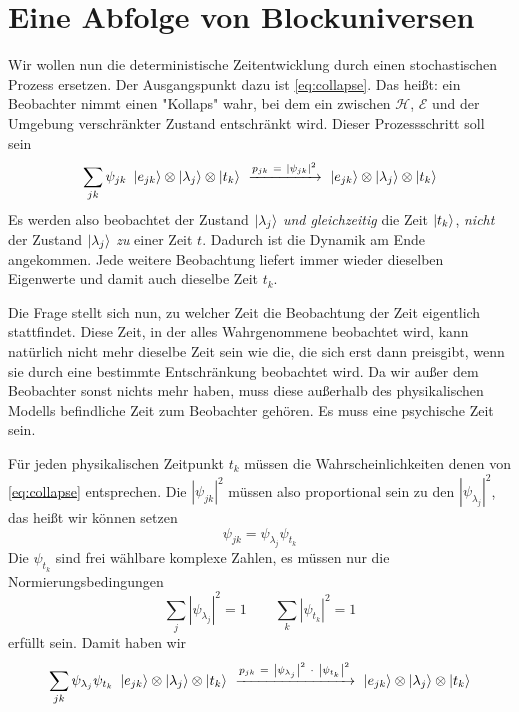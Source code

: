 \documentclass[12pt]{article}
\begin{document}
\section{Eine Abfolge von Blockuniversen}

Wir wollen nun die deterministische Zeitentwicklung durch einen stochastischen Prozess ersetzen. Der Ausgangspunkt dazu ist \eqref{eq:collapse}. Das heißt: ein Beobachter nimmt einen "Kollaps" wahr, bei dem ein zwischen $\mathscr{H}$, $\mathscr{E}$ und der Umgebung verschränkter Zustand entschränkt wird. Dieser Prozessschritt soll sein
\begin{equation*} 
\sum_{jk} \psi_{jk}\ \ket{e_{jk}} \otimes \ket{\lambda_j} \otimes \ket{t_k} 
\ \xrightarrow{p_{jk}\ =\ \left|\psi_{jk}\right|^2}\ 
\ket{e_{jk}} \otimes \ket{\lambda_j} \otimes \ket{t_k}
\end{equation*}
Es werden also beobachtet der Zustand $\ket{\lambda_j}$ \emph{und gleichzeitig} die Zeit $\ket{t_k}$, \emph{nicht} der Zustand $\ket{\lambda_j}$ \emph{zu} einer Zeit $t$. Dadurch ist die Dynamik am Ende angekommen. Jede weitere Beobachtung liefert immer wieder dieselben Eigenwerte und damit auch dieselbe Zeit $t_k$. 

Die Frage stellt sich nun, zu welcher Zeit die Beobachtung der Zeit eigentlich stattfindet. Diese Zeit, in der alles Wahrgenommene beobachtet wird, kann natürlich nicht mehr dieselbe Zeit sein wie die, die sich erst dann preisgibt, wenn sie durch eine bestimmte Entschränkung beobachtet wird. Da wir außer dem Beobachter sonst nichts mehr haben, muss diese außerhalb des physikalischen Modells befindliche Zeit zum Beobachter gehören. Es muss eine psychische Zeit sein.

Für jeden physikalischen Zeitpunkt $t_k$ müssen die Wahrscheinlichkeiten denen von \eqref{eq:collapse} entsprechen. Die $\left|\psi_{jk}\right|^2$ müssen also proportional sein zu den $\left|\psi_{\lambda_j}\right|^2$, das heißt wir können setzen
\begin{equation*}
\psi_{jk} =  \psi_{\lambda_j} \psi_{t_k}
\end{equation*}
Die $\psi_{t_k}$ sind frei wählbare komplexe Zahlen, es müssen nur die Normierungsbedingungen
\begin{equation*}
\sum_j \left|\psi_{\lambda_j}\right|^2 = 1 \quad\quad
\sum_{k} \left|\psi_{t_k}\right|^2 = 1
\end{equation*}
erfüllt sein. Damit haben wir 
\begin{equation} 
\label{eq:collapse_with_time}
\sum_{jk} \psi_{\lambda_j}\psi_{t_k} \ \ket{e_{jk}} \otimes \ket{\lambda_j} \otimes \ket{t_k} 
\ \xrightarrow{p_{jk}\ =\ \left|\psi_{\lambda_j}\right|^2\ \cdot\ \left|\psi_{t_k}\right|^2}\ 
\ket{e_{jk}} \otimes \ket{\lambda_j} \otimes \ket{t_k}
\end{equation}
\end{document}
